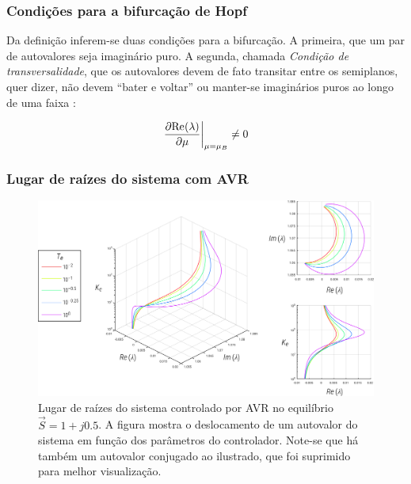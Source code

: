 \documentclass[10pt, compress,xcolor={svgnames,dvipsnames,x11names}]{beamer}
\begin{document}
\begin{frame}%
\frametitle{Condições para a bifurcação de Hopf}
\scriptsize

	Da definição inferem-se duas condições para a bifurcação. A primeira, que um par de autovalores seja imaginário puro. A segunda, chamada \textit{Condição de transversalidade}, que os autovalores devem de fato transitar entre os semiplanos, quer dizer, não devem ``bater e voltar'' ou manter-se imaginários puros ao longo de uma faixa \cite{phdHopf}:

\begin{equation}
	\left. \dfrac{\partial \text{Re}\hspace{-0.5mm} \left(\lambda \right)}{\partial \mu} \right|_{\mu = \mu_B} \neq 0
\end{equation}

\normalsize
\end{frame}%

	
\begin{frame}%
\frametitle{Lugar de raízes do sistema com AVR}
\scriptsize

\begin{figure}[htb]
	\begin{center}
	    \includegraphics[width = 0.9\columnwidth]{../images/presentation/lugarDeRaizesGeral.pdf}
	\end{center}
	\caption{\label{fig::lugarDeRaizes} Lugar de raízes do sistema controlado por AVR no equilíbrio $\vec{S} = 1 + j0.5$. A figura mostra o deslocamento de um autovalor do sistema em função dos parâmetros do controlador. Note-se que há também um autovalor conjugado ao ilustrado, que foi suprimido para melhor visualização.}
\end{figure}

\normalsize
\end{frame}%
\end{document}
